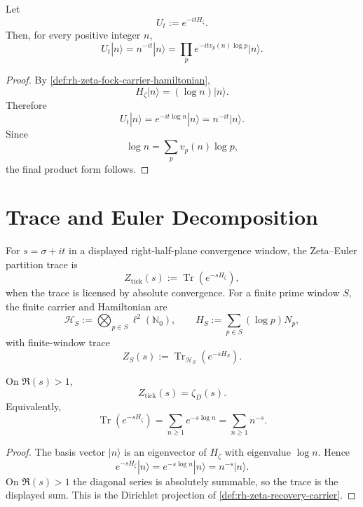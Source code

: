 \begin{theorem}
\label{thm:rh-zeta-phase-flow-prime-ledger-transport}
Let
$$
U_t:=e^{-itH_{\zeta}}.
$$
Then, for every positive integer $n$,
$$
U_t|n\rangle
=
n^{-it}|n\rangle
=
\prod_p e^{-itv_p(n)\log p}|n\rangle.
$$
\end{theorem}

\begin{proof}
By \autoref{def:rh-zeta-fock-carrier-hamiltonian},
$$
H_{\zeta}|n\rangle=(\log n)|n\rangle.
$$
Therefore
$$
U_t|n\rangle=e^{-it\log n}|n\rangle=n^{-it}|n\rangle.
$$
Since
$$
\log n=\sum_p v_p(n)\log p,
$$
the final product form follows.
\end{proof}

\section{Trace and Euler Decomposition}
\label{sec:rh-zeta-euler-trace-decomposition}

\begin{definition}
\label{def:rh-zeta-partition-trace}
For $s=\sigma+it$ in a displayed right-half-plane convergence window, the
Zeta--Euler partition trace is
$$
Z_{\mathrm{tick}}(s):=
\operatorname{Tr}(e^{-sH_{\zeta}}),
$$
when the trace is licensed by absolute convergence. For a finite prime
window $S$, the finite carrier and Hamiltonian are
$$
\mathcal H_S:=\bigotimes_{p\in S}\ell^2(\mathbb N_0),
\qquad
H_S:=\sum_{p\in S}(\log p)N_p,
$$
with finite-window trace
$$
Z_S(s):=\operatorname{Tr}_{\mathcal H_S}(e^{-sH_S}).
$$
\end{definition}

\begin{theorem}
\label{thm:rh-zeta-trace-dirichlet-projection}
On $\Re(s)>1$,
$$
Z_{\mathrm{tick}}(s)=\zeta_D(s).
$$
Equivalently,
$$
\operatorname{Tr}(e^{-sH_{\zeta}})
=
\sum_{n\ge1}e^{-s\log n}
=
\sum_{n\ge1}n^{-s}.
$$
\end{theorem}

\begin{proof}
The basis vector $|n\rangle$ is an eigenvector of $H_{\zeta}$ with
eigenvalue $\log n$. Hence
$$
e^{-sH_{\zeta}}|n\rangle=e^{-s\log n}|n\rangle=n^{-s}|n\rangle.
$$
On $\Re(s)>1$ the diagonal series is absolutely summable, so the trace is
the displayed sum. This is the Dirichlet projection of
\autoref{def:rh-zeta-recovery-carrier}.
\end{proof}

